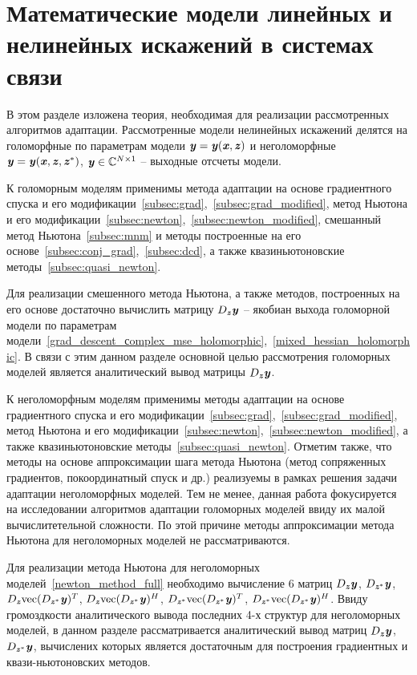 \section{Математические модели линейных и нелинейных искажений в системах связи}
В этом разделе изложена теория, необходимая для реализации рассмотренных алгоритмов адаптации. Рассмотренные модели нелинейных искажений делятся на голоморфные по параметрам модели $\textbf{\textit{y}}=\textbf{\textit{y}}(\textbf{\textit{x}}, \textbf{\textit{z}})$ и неголоморфные $\textbf{\textit{y}}=\textbf{\textit{y}}(\textbf{\textit{x}}, \textbf{\textit{z}}, \textbf{\textit{z}}^*)$, $\textbf{\textit{y}}\in\mathbb{C}^{N\times1}$ -- выходные отсчеты модели.

К голоморным моделям применимы метода адаптации на основе градиентного спуска и его модификации~\ref{subsec:grad},~\ref{subsec:grad_modified}, метод Ньютона и его модификации~\ref{subsec:newton},~\ref{subsec:newton_modified}, смешанный метод Ньютона~\ref{subsec:mnm} и методы построенные на его основе~\ref{subsec:conj_grad},~\ref{subsec:dcd}, а также квазиньютоновские методы~\ref{subsec:quasi_newton}. 

Для реализации смешенного метода Ньютона, а также методов, построенных на его основе достаточно вычислить матрицу $D_{\textbf{\textit{z}}}\textbf{\textit{y}}$ -- якобиан выхода голоморной модели по параметрам модели~\eqref{grad_descent_сomplex_mse_holomorphic},~\eqref{mixed_hessian_holomorphic}. В связи с этим данном разделе основной целью рассмотрения голоморных моделей является аналитический вывод матрицы $D_{\textbf{\textit{z}}}\textbf{\textit{y}}$.

К неголоморфным моделям применимы методы адаптации на основе градиентного спуска и его модификации~\ref{subsec:grad},~\ref{subsec:grad_modified}, метод Ньютона и его модификации~\ref{subsec:newton},~\ref{subsec:newton_modified}, а также квазиньютоновские методы~\ref{subsec:quasi_newton}. Отметим также, что методы на основе аппроксимации шага метода Ньютона (метод сопряженных градиентов, покоординатный спуск и др.) реализуемы в рамках решения задачи адаптации неголоморфных моделей. Тем не менее, данная работа фокусируется на исследовании алгоритмов адаптации голоморных моделей ввиду их малой вычислитетельной сложности. По этой причине методы аппроксимации метода Ньютона для неголоморных моделей не рассматриваются.

Для реализации метода Ньютона для неголоморных моделей~\eqref{newton_method_full} необходимо вычисление 6 матриц $D_{\textbf{\textit{z}}}\textbf{\textit{y}}$, $D_{\textbf{\textit{z}}^*}\textbf{\textit{y}}$, $D_{\textbf{\textit{z}}}\text{vec}(D_{\textbf{\textit{z}}^*}\textbf{\textit{y}})^T$, $D_{\textbf{\textit{z}}}\text{vec}(D_{\textbf{\textit{z}}^*}\textbf{\textit{y}})^H$, $D_{\textbf{\textit{z}}^*}\text{vec}(D_{\textbf{\textit{z}}^*}\textbf{\textit{y}})^T$, $D_{\textbf{\textit{z}}^*}\text{vec}(D_{\textbf{\textit{z}}^*}\textbf{\textit{y}})^H$. Ввиду громоздкости аналитического вывода последних 4-х структур для неголоморных моделей, в данном разделе рассматривается аналитический вывод матриц $D_{\textbf{\textit{z}}}\textbf{\textit{y}}$, $D_{\textbf{\textit{z}}^*}\textbf{\textit{y}}$, вычислених которых является достаточным для построения градиентных и квази-ньютоновских методов. 

